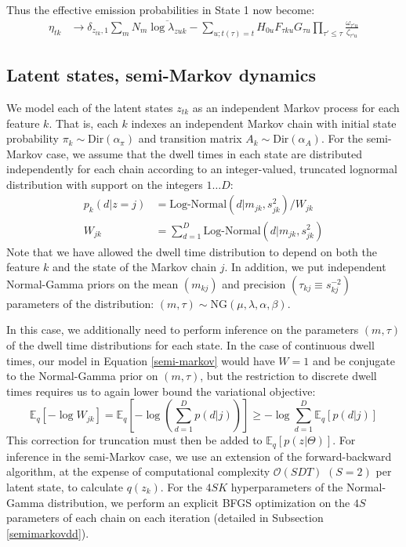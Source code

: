 Thus the effective emission probabilities in State 1 now become:
\begin{align}
    \eta_{tk} &\rightarrow \delta_{z_{tk}, 1} \sum_{m} N_m \overline{\log \lambda_{zuk}}
    - \sum_{u; t(\tau) = t} H_{0u} F_{\tau ku} G_{\tau u} \prod_{\tau' \le \tau} \frac{\omega_{\tau' u}}{\zeta_{\tau' u}}
\end{align}


\subsection{Latent states, semi-Markov dynamics}

We model each of the latent states $z_{tk}$ as an independent Markov process for each feature $k$. That is, each $k$ indexes an independent Markov chain with initial state probability $\pi_k\sim \text{Dir}(\alpha_\pi)$ and transition matrix $A_k\sim \text{Dir}(\alpha_A)$. For the semi-Markov case, we assume that the dwell times in each state are distributed independently for each chain according to an integer-valued, truncated lognormal distribution with support on the integers $1\dots D$:
\begin{align}
    \label{semi-markov}
    p_k(d|z = j) &= \text{Log-Normal}(d|m_{jk}, s^2_{jk}) / W_{jk}  \\
    W_{jk} &= \sum_{d = 1}^D \text{Log-Normal}(d|m_{jk}, s^2_{jk})
\end{align}
Note that we have allowed the dwell time distribution to depend on both the feature $k$ and the state of the Markov chain $j$. In addition, we put independent Normal-Gamma priors on the mean $(m_{kj})$ and precision $(\tau_{kj} \equiv s_{kj}^{-2})$ parameters of the distribution: $(m, \tau) \sim \text{NG}(\mu, \lambda, \alpha, \beta)$.

In this case, we additionally need to perform inference on the parameters $(m, \tau)$ of the dwell time distributions for each state. In the case of continuous dwell times, our model in Equation \ref{semi-markov} would have $W = 1$ and be conjugate to the Normal-Gamma prior on $(m, \tau)$, but the restriction to discrete dwell times requires us to again lower bound the variational objective:
\begin{equation}
    \mathbb{E}_q\left[-\log W_{jk} \right] =
    \mathbb{E}_q\left[- \log \left( \sum_{d=1}^D p(d|j)\right) \right]
    \ge -\log \sum_{d = 1}^D \mathbb{E}_q\left[p(d|j)\right]
\end{equation}
This correction for truncation must then be added to $\mathbb{E}_q[p(z|\Theta)]$. For inference in the semi-Markov case, we use an extension of the forward-backward algorithm\cite{Yu2006-bb}, at the expense of computational complexity $\mathcal{O}(SDT)$ $(S = 2)$ per latent state, to calculate $q(z_k)$. For the $4SK$ hyperparameters of the Normal-Gamma distribution, we perform an explicit BFGS optimization on the $4S$ parameters of each chain on each iteration (detailed in Subsection \ref{semimarkovdd}).


